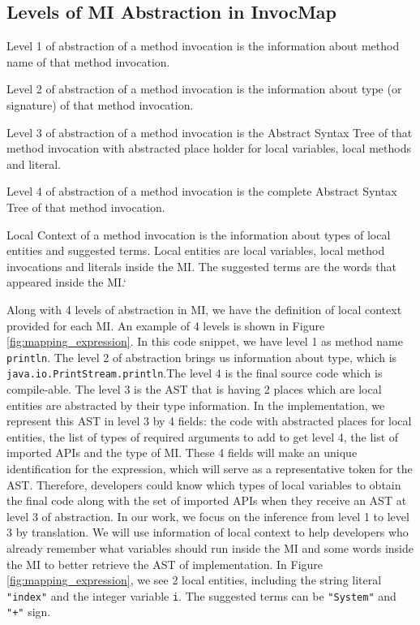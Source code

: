 \subsection{Levels of MI Abstraction in InvocMap}
\begin{definition}
Level 1 of abstraction of a method invocation is the information about method name of that method invocation.
\end{definition}
\begin{definition}
Level 2 of abstraction of a method invocation is the information about type (or signature) of that method invocation.
\end{definition}
\begin{definition}
Level 3 of abstraction of a method invocation is the Abstract Syntax Tree of that method invocation with abstracted place holder for local variables, local methods and literal.
\end{definition}
\begin{definition}
Level 4 of abstraction of a method invocation is the complete Abstract Syntax Tree of that method invocation.
\end{definition}

\begin{definition}
Local Context of a method invocation is the information about types of local entities and suggested terms. Local entities are local variables, local method invocations and literals inside the MI. The suggested terms are the words that appeared inside the MI.`
\end{definition}

Along with 4 levels of abstraction in MI, we have the definition of local context provided for each MI. An example of 4 levels is shown in Figure \ref{fig:mapping_expression}. In this code snippet, we have level 1 as method name \texttt{println}. The level 2 of abstraction brings us information about type, which is \texttt{java.io.PrintStream.println}.The level 4 is the final source code which is compile-able. The level 3 is the AST that is having 2 places which are local entities are abstracted by their type information. In the implementation, we represent this AST in level 3 by 4 fields: the code with abstracted places for local entities, the list of types of required arguments to add to get level 4, the list of imported APIs and the type of MI. These 4 fields will make an unique identification for the expression, which will serve as a representative token for the AST. Therefore, developers could know which types of local variables to obtain the final code along with the set of imported APIs when they receive an AST at level 3 of abstraction. In our work, we focus on the inference from level 1 to level 3 by translation.
We will use information of local context to help developers who already remember what variables should run inside the MI and some words inside the MI to better retrieve the AST of implementation. In Figure \ref{fig:mapping_expression}, we see 2 local entities, including the string literal \texttt{"index"} and the integer variable \texttt{i}. The suggested terms can be \texttt{"System"} and \texttt{"+"} sign. 



